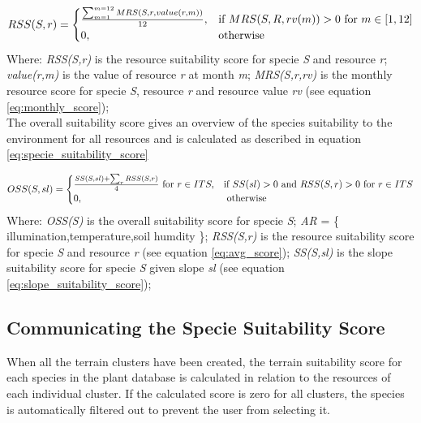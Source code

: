 \begin{equation}
\centering
RSS(S,r) =
\begin{cases}
	\frac{\sum_{m=1}^{m=12} MRS(S,r,value(r,m))}{12}, & \text{if } MRS(S,R,rv(m)) > 0 \text{ for } m \in [1,12] \\
    0,              & \text{otherwise}
\end{cases}
\label{eq:avg_score}
\end{equation}
Where: \textit{RSS(S,r)} is the resource suitability score for specie \textit{S} and resource \textit{r}; \textit{value(r,m)} is the value of resource \textit{r} at month \textit{m}; \textit{MRS(S,r,rv)} is the monthly resource score for specie \textit{S}, resource \textit{r} and resource value \textit{rv} (see equation \ref{eq:monthly_score});\\

The overall suitability score gives an overview of the species suitability to the environment for all resources and is calculated as described in equation \ref{eq:specie_suitability_score}

\begin{equation}
\begin{split}
\centering
OSS(S,sl) = 
\begin{cases}
	\frac{SS(S,sl) + \sum_{r}^{}RSS(S,r)}{4} \text{ for } r \in ITS, & \text{if } SS(sl) > 0 \text{ and } RSS(S,r) > 0 \text{ for } r \in ITS \\
	0, &\text{ otherwise} \\
\end{cases}
\end{split}
\label{eq:specie_suitability_score}
\end{equation}
Where: \textit{OSS(S)} is the overall suitability score for specie \textit{S}; \textit{AR} = \{ illumination,temperature,soil humdity \}; \textit{RSS(S,r)} is the resource suitability score for specie \textit{S} and resource \textit{r} (see equation \ref{eq:avg_score}); \textit{SS(S,sl)} is the slope suitability score for specie \textit{S} given slope \textit{sl} (see equation \ref{eq:slope_suitability_score}); 

\subsection{Communicating the Specie Suitability Score}

When all the terrain clusters have been created, the terrain suitability score for each species in the plant database is calculated in relation to the resources of each individual cluster. If the calculated score is zero for all clusters, the species is automatically filtered out to prevent the user from selecting it. \\

